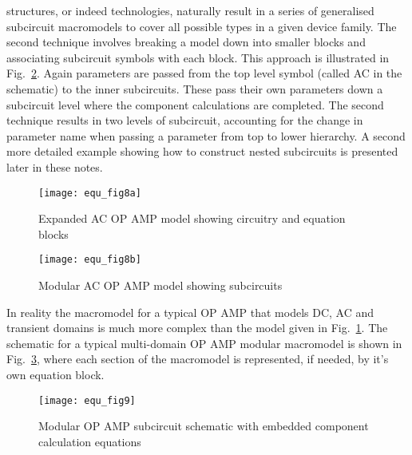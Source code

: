structures, or indeed technologies, naturally result in a series of
generalised subcircuit macromodels to cover all possible types in a
given device family.  The second technique involves breaking a model
down into smaller blocks and associating subcircuit symbols with each
block. This approach is illustrated in Fig.~\ref{fig:equ_8b}. Again
parameters are passed from the top level symbol (called AC in the
schematic) to the inner subcircuits. These pass their own parameters
down a subcircuit level where the component calculations are
completed. The second technique results in two levels of subcircuit,
accounting for the change in parameter name when passing a parameter
from top to lower hierarchy. A second more detailed example showing
how to construct nested subcircuits is presented later in these notes.

\begin{figure}
  \centering
  \texttt{[image: equ\_fig8a]}
  \caption{Expanded AC OP AMP model showing circuitry and equation blocks} 
  \label{fig:equ_8a}
\end{figure} 


\begin{figure}
  \centering
  \texttt{[image: equ\_fig8b]}
  \caption{Modular AC OP AMP model showing subcircuits}
  \label{fig:equ_8b}
\end{figure} 


\vspace{5mm}
In reality the macromodel for a typical OP AMP that models DC, AC and
transient domains is much more complex than the model given in
Fig.~\ref{fig:equ_8a}.  The schematic for a typical multi-domain OP
AMP modular macromodel is shown in Fig.~\ref{fig:equ_9}, where each
section of the macromodel is represented, if needed, by it's own
equation block.

 


\begin{figure}
  \centering
  \texttt{[image: equ\_fig9]}
  \caption{Modular OP AMP subcircuit schematic with embedded component calculation equations}
  \label{fig:equ_9}
\end{figure} 

\vspace{3mm}

